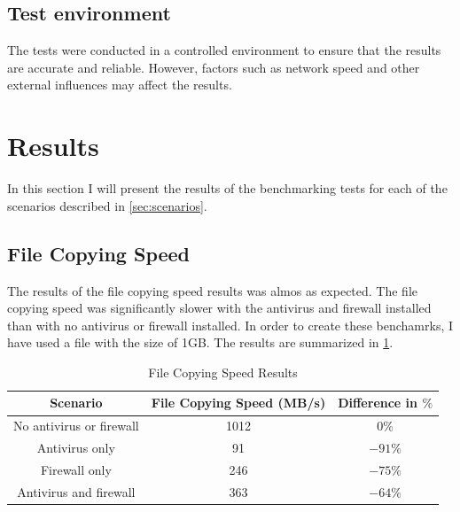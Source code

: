 \documentclass[runningheads,a4paper,english]{llncs}[2022/01/12]
\begin{document}
\subsection{Test environment}
\label{sec:environment}

\par The tests were conducted in a controlled environment to ensure that the
results are accurate and reliable. However, factors such as network speed and
other external influences may affect the results.


\section{Results}\label{sec:results}

\par In this section I will present the results of the benchmarking tests for
each of the scenarios described in \cref{sec:scenarios}.

\subsection{File Copying Speed}
\label{sec:copying}

\par The results of the file copying speed results was almos as expected. The
file copying speed was significantly slower with the antivirus and firewall
installed than with no antivirus or firewall installed. In order to create
these benchamrks, I have used a file with the size of 1GB.  The results are
summarized in \cref{tab:filecopy}.

\begin{table}[h]
\centering
  \begin{tabular}{|c|c|c|}
    \hline
    Scenario & File Copying Speed (MB/s) & Difference in $\%$ \\
    \hline
    No antivirus or firewall & 1012 & $0\%$ \\
    Antivirus only & 91 & $-91\%$ \\
    Firewall only & 246  & $-75\%$ \\
    Antivirus and firewall & 363 & $-64\%$ \\
    \hline
  \end{tabular}
  \caption{File Copying Speed Results}
  \label{tab:filecopy}
\end{table}
\end{document}
